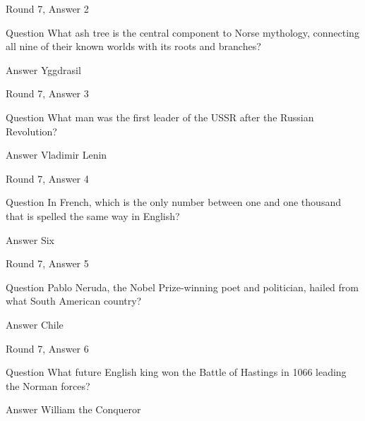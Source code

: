 \documentclass[11pt]{beamer}
\begin{document}
\begin{frame}[t]{Round 7, Answer 2}
\vspace{2em}
\begin{block}{Question}
What ash tree is the central component to Norse mythology, connecting all nine of their known worlds with its roots and branches\@?
\end{block}
\pause{}
\begin{block}{Answer}
Yggdrasil
\end{block}
\end{frame}
    

\begin{frame}[t]{Round 7, Answer 3}
\vspace{2em}
\begin{block}{Question}
What man was the first leader of the USSR after the Russian Revolution\@?
\end{block}
\pause{}
\begin{block}{Answer}
Vladimir Lenin
\end{block}
\end{frame}
    

\begin{frame}[t]{Round 7, Answer 4}
\vspace{2em}
\begin{block}{Question}
In French, which is the only number between one and one thousand that is spelled the same way in English\@?
\end{block}
\pause{}
\begin{block}{Answer}
Six
\end{block}
\end{frame}
    

\begin{frame}[t]{Round 7, Answer 5}
\vspace{2em}
\begin{block}{Question}
Pablo Neruda, the Nobel Prize-winning poet and politician, hailed from what South American country\@?
\end{block}
\pause{}
\begin{block}{Answer}
Chile
\end{block}
\end{frame}
    

\begin{frame}[t]{Round 7, Answer 6}
\vspace{2em}
\begin{block}{Question}
What future English king won the Battle of Hastings in 1066 leading the Norman forces\@?
\end{block}
\pause{}
\begin{block}{Answer}
William the Conqueror
\end{block}
\end{frame}
    
\end{document}

